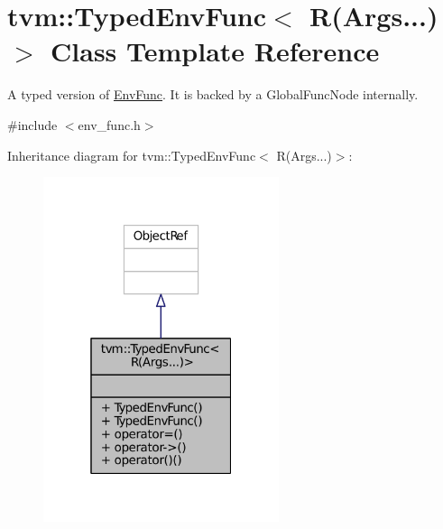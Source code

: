 \hypertarget{classtvm_1_1TypedEnvFunc_3_01R_07Args_8_8_8_08_4}{}\section{tvm\+:\+:Typed\+Env\+Func$<$ R(Args...)$>$ Class Template Reference}
\label{classtvm_1_1TypedEnvFunc_3_01R_07Args_8_8_8_08_4}


A typed version of \hyperlink{classtvm_1_1EnvFunc}{Env\+Func}. It is backed by a Global\+Func\+Node internally.  




{\ttfamily \#include $<$env\+\_\+func.\+h$>$}



Inheritance diagram for tvm\+:\+:Typed\+Env\+Func$<$ R(Args...)$>$\+:
\nopagebreak
\begin{figure}[H]
\begin{center}
\leavevmode
\includegraphics[width=196pt]{classtvm_1_1TypedEnvFunc_3_01R_07Args_8_8_8_08_4__inherit__graph}
\end{center}
\end{figure}



